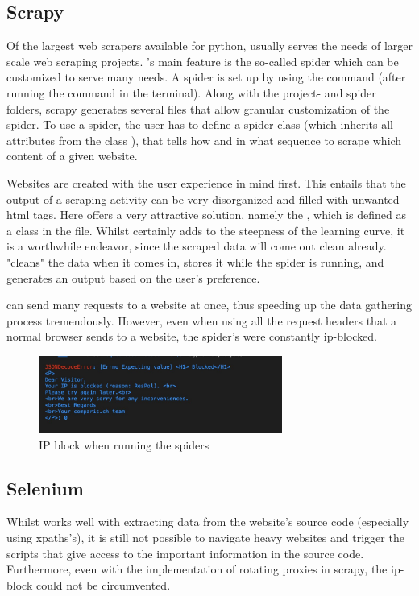 \documentclass[main]{subfiles}
\begin{document}
\subsection{Scrapy}
Of the largest web scrapers available for python, 
\pkg[Scrapy] usually serves the needs of larger scale web scraping projects.
\pkg[Scrapy]'s main feature is the so-called spider which can be customized to serve many needs.
A spider is set up by using the  command 
(after running the  command in the terminal).
Along with the project- and spider folders, scrapy generates several \pkg[.py] 
files that allow granular customization of the spider.
To use a spider, the user has to define a spider class (which inherits all attributes from the class ),
that tells \pkg[Scrapy] how and in what sequence to scrape which content of a given website.

Websites are created with the user experience in mind first.
This entails that the output of a scraping activity can be very disorganized and filled with unwanted \acs*{html} tags.
Here \pkg[Scrapy] offers a very attractive solution, namely the \pkg[ItemLoader], 
which is defined as a class in the \pkg[items.py] file.
Whilst \pkg[ItemLoader] certainly adds to the steepness of the learning curve, it is a worthwhile endeavor, 
since the scraped data will come out clean already. 
\pkg[ItemLoader] "cleans" the data when it comes in, stores it while the spider is running, 
and generates an output based on the user's preference.

\pkg[Scrapy] can send many requests to a website at once, 
thus speeding up the data gathering process tremendously.
However, even when using all the request headers that a normal browser sends to a website, 
the \pkg[Scrapy] spider's were constantly \acs*{ip}-blocked.

\begin{figure}[htbp]
    \centerline{
        \includegraphics[width = 80mm]{prog_2.png}}
    \caption{IP block when running the spiders}
    \label{fig:block}
\end{figure}

\subsection{Selenium}
Whilst \pkg[Scrapy] works well with extracting data from the website's source code (especially using \acsp*{xpath}'s), 
it is still not possible to navigate \js heavy websites and trigger the scripts that give access to the important information in the source code.
Furthermore, even with the implementation of rotating proxies in scrapy, the \acs*{ip}-block could not be circumvented.
\end{document}
